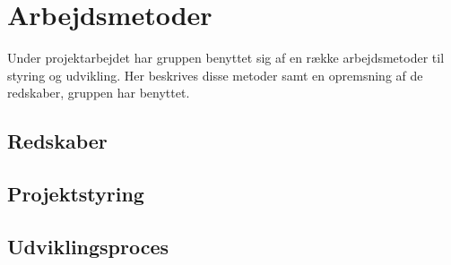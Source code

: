 \chapter{Arbejdsmetoder}\label{kapitel_Arbejdsmetoder}
Under projektarbejdet har gruppen benyttet sig af en række arbejdsmetoder til styring og udvikling.
Her beskrives disse metoder samt en opremsning af de redskaber, gruppen har benyttet.


\section{Redskaber}


\section{Projektstyring}


\section{Udviklingsproces}
